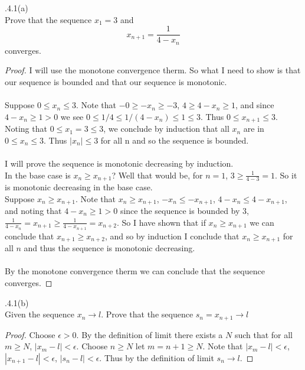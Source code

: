 \documentclass[12pt]{article}
\makeatletter
\theoremstyle{homework}
\newenvironment{exercise}[1]
{\def\@currentlabel{#1}\exercisecore}
{\endexercisecore}
\makeatother
\begin{document}
\begin{exercise}

2.4.1(a)\\
Prove that the sequence $x_1=3$ and
$$x_{n+1}=\frac{1}{4-x_n}
$$
converges.
\end{exercise}
\begin{proof}
I will use the monotone convergence therm.  So what I need to show is that our sequence is bounded and that our sequence is monotonic.\\\\
Suppose $0\leq x_n \leq 3$.  Note that $-0\geq -x_n \geq -3$, $4\geq 4-x_n \geq 1$, and since $4-x_n\geq 1>0$ we see $0\leq 1/4\leq1/( 4-x_n) \leq 1\leq 3$.  Thus $0\leq x_{n+1} \leq 3$.  Noting that $0\leq x_1=3\leq 3$, we conclude by induction that all $x_n$ are in $0\leq x_n \leq 3$.  Thus $|x_n|\leq 3$ for all n and so the sequence is bounded.\\\\
I will prove the sequence is monotonic decreasing by induction.\\
In the base case is $x_n\geq x_{n+1}$?  Well that would be, for $n=1$, $3\geq \frac{1}{4-3}=1$.  So it is monotonic decreasing in the base case.\\
Suppose $x_n\geq x_{n+1}$.  Note that $x_n\geq x_{n+1}$, $-x_n\leq -x_{n+1}$, $4-x_n\leq 4-x_{n+1}$, and noting that $4-x_n\geq1>0$ since the sequence is bounded by 3, $\frac{1}{4-x_n}=x_{n+1}\geq \frac{1}{4-x_{n+1}}=x_{n+2}$.  So I have shown that if $x_n\geq x_{n+1}$ we can conclude that $x_{n+1}\geq x_{n+2}$, and so by induction I conclude that $x_n\geq x_{n+1}$ for all $n$ and thus the sequence is monotonic decreasing.\\\\
By the monotone convergence therm we can conclude that the sequence converges.
\end{proof}
\begin{exercise}

2.4.1(b)\\
Given the sequence $x_n\rightarrow l$.  Prove that the sequence $s_n=x_{n+1}\rightarrow l$
\end{exercise}
\begin{proof}
Choose $\epsilon>0$.  By the definition of limit there exists a $N$ such that for all $m\geq N$, $|x_m-l|<\epsilon$.  Choose $n\geq N$ let $m=n+1\geq N$.  Note that $|x_m-l|<\epsilon$, $|x_{n+1}-l|<\epsilon$, $|s_n-l|<\epsilon$.  Thus by the definition of limit $s_n\rightarrow l$.
\end{proof}
\end{document}
